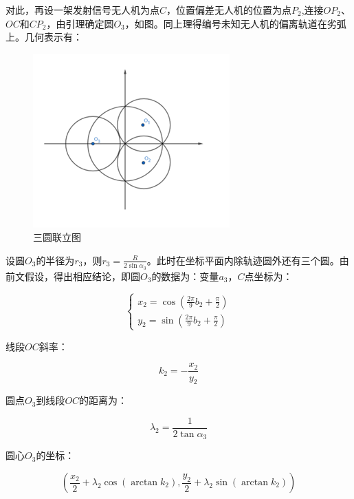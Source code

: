 对此，再设一架发射信号无人机为点$C$，位置偏差无人机的位置为点$P_2$,连接$OP_2$、$OC$和$CP_2$，由引理确定圆$O_3$，如图。同上理得编号未知无人机的偏离轨道在劣弧上。几何表示有：

\begin{figure}
    \centering
    \includegraphics{res/figure111123.png}
    \caption{三圆联立图}
\end{figure}

设圆$O_3$的半径为$r_3$，则$r_3=\frac{R}{2\sin\alpha_3}$。此时在坐标平面内除轨迹圆外还有三个圆。由前文假设，得出相应结论，即圆$O_3$的数据为：变量$a_3$，$C$点坐标为：

\begin{equation}
    \begin{cases}
        x_2 = \cos\left(
            \frac{2\pi}{9}b_2 + \frac{\pi}{2}
        \right) \\
        y_2 = \sin\left(
            \frac{2\pi}{9}b_2 + \frac{\pi}{2}
        \right)
    \end{cases}
\end{equation}

线段$OC$斜率：

\begin{equation}
    k_2 = - \frac{x_2}{y_2}
\end{equation}

圆点$O_3$到线段$OC$的距离为：

\begin{equation}
    \lambda_2 = \frac{1}{2\tan\alpha_3}
\end{equation}

圆心$O_3$的坐标：

\begin{equation}
    \left(
        \frac{x_2}{2} + \lambda_2\cos(\arctan k_2),
        \frac{y_2}{2} + \lambda_2\sin(\arctan k_2)
    \right)
\end{equation}

